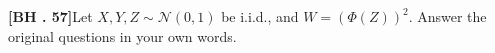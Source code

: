 \begin{exercise}
	\textbf{[BH . 57]}Let $X, Y, Z \sim \mathcal{N}(0,1)$ be i.i.d., and $W=(\Phi(Z))^2$. Answer the original questions in your own words.
\end{exercise}